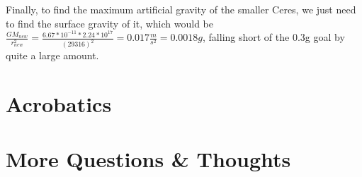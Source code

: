 \documentclass{amsart}
\theoremstyle{definition}
\begin{document}
Finally, to find the maximum artificial gravity of the smaller Ceres, we just need to find the surface gravity of it, which would be \(\frac{GM_{new}}{r_{new}^2}=\frac{6.67*10^{-11}*2.24*10^{17}}{(29316)^2} = 0.017\frac{m}{s^2} = 0.0018g\), falling short of the 0.3g goal by quite a large amount.




\section{Acrobatics}





\section{More Questions \& Thoughts}
\end{document}
